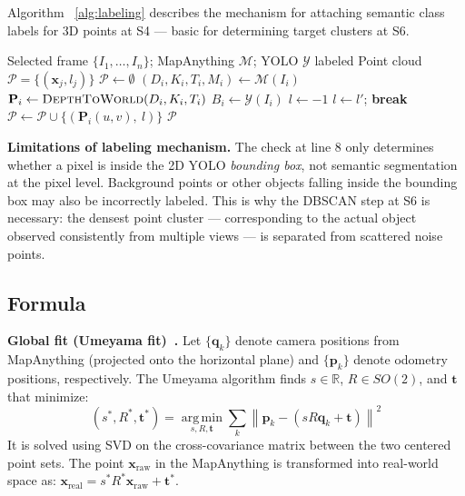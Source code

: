 \documentclass[conference]{IEEEtran}
\begin{document}
Algorithm ~\ref{alg:labeling} describes the mechanism for attaching semantic class labels for 3D points at S4 — basic for determining target clusters at S6.

\begin{algorithm}[!ht]
\footnotesize
\caption{Attaching semantic class labels for 3D point cloud}
\label{alg:labeling}
\begin{algorithmic}[1]
\Require Selected frame $\{I_1, \dots, I_n\}$; MapAnything $\mathcal{M}$; YOLO $\mathcal{Y}$
\Ensure labeled Point cloud $\mathcal{P} = \{(\mathbf{x}_j, l_j)\}$
\State $\mathcal{P} \gets \emptyset$
    \State $(D_i, K_i, T_i, M_i) \gets \mathcal{M}(I_i)$ 
    \State $\mathbf{P}_i \gets \textsc{DepthToWorld}(D_i, K_i, T_i)$
    \State $B_i \gets \mathcal{Y}(I_i)$ 
        \State $l \gets -1$ 
                \State $l \gets l'$; \textbf{break}
            \EndIf
        \EndFor
        \State $\mathcal{P} \gets \mathcal{P} \cup \{(\mathbf{P}_i(u, v),\ l)\}$
    \EndFor
\EndFor
\State \Return $\mathcal{P}$
\end{algorithmic}
\end{algorithm}

\textbf{Limitations of labeling mechanism.} The check at line 8 only determines whether a pixel is inside the 2D YOLO \emph{bounding box}, not semantic segmentation at the pixel level. Background points or other objects falling inside the bounding box may also be incorrectly labeled. This is why the DBSCAN step at S6 is necessary: the densest point cluster — corresponding to the actual object observed consistently from multiple views — is separated from scattered noise points.

\subsection{Formula}
\label{sec:math}

\textbf{Global fit (Umeyama fit)~\cite{88573}.} Let $\{\mathbf{q}_k\}$ denote camera positions from MapAnything (projected onto the horizontal plane) and $\{\mathbf{p}_k\}$ denote odometry positions, respectively. The Umeyama algorithm finds $s \in \mathbb{R}$, $R \in SO(2)$, and $\mathbf{t}$ that minimize:
\begin{equation}
(s^*, R^*, \mathbf{t}^*) = \operatorname*{arg\,min}_{s, R, \mathbf{t}} \sum_k \left\lVert \mathbf{p}_k - \left(s R \mathbf{q}_k + \mathbf{t}\right) \right\rVert^2
\end{equation}
It is solved using SVD on the cross-covariance matrix between the two centered point sets. The point $\mathbf{x}_{\text{raw}}$ in the MapAnything is transformed into real-world space as: $\mathbf{x}_{\text{real}} = s^* R^* \mathbf{x}_{\text{raw}} + \mathbf{t}^*$.
\end{document}
